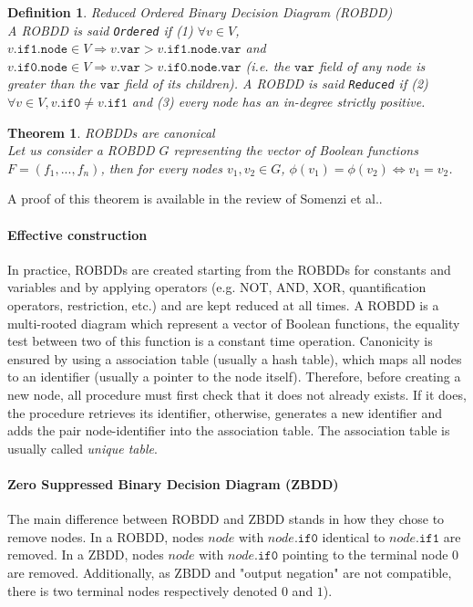 \documentclass[a4paper,10pt]{article}
\newcommand{\fieldVar}{\texttt{var}}
\newcommand{\fieldNode}{\texttt{node}}
\newcommand{\fieldThen}{\mathtt{if1}}
\newcommand{\fieldElse}{\mathtt{if0}}
\newtheorem{newtheo}{Theorem}
\newcommand{\theorem}[2]{\begin{newtheo}{\textsf{#1}\\} #2 \end{newtheo}}
\newtheorem{newdef}{Definition}
\newcommand{\definition}[2]{\begin{newdef}{#1\\}#2\end{newdef}}
\begin{document}
\definition{Reduced Ordered Binary Decision Diagram (ROBDD)}
{
A ROBDD is said \texttt{Ordered} if (1) $\forall v\in V$, $v.\fieldThen{}.\fieldNode{}\in V \Rightarrow v.\fieldVar{}> v.\fieldThen{}.\fieldNode{}.\fieldVar{}$ and $v.\fieldElse{}.\fieldNode{}\in V \Rightarrow v.\fieldVar{}> v.\fieldElse{}.\fieldNode{}.\fieldVar{}$ (i.e. the $\fieldVar{}$ field of any node is greater than the $\fieldVar{}$ field of its children).
A ROBDD is said \texttt{Reduced} if (2) $\forall v\in V, v.\fieldElse{} \neq v.\fieldThen{}$ and (3) every node has an in-degree strictly positive.
}

\theorem{ROBDDs are canonical}
{
Let us consider a ROBDD $G$ representing the vector of Boolean functions $F=(f_1, ..., f_n)$, then for every nodes $v_1, v_2 \in G$, $\phi(v_1) = \phi(v_2) \Leftrightarrow v_1 = v_2$.
}
A proof of this theorem is available in the review of Somenzi et al.\cite{Somenzi1999}.

\paragraph{Effective construction\\}
In practice, ROBDDs are created starting from the ROBDDs for constants and variables and by applying operators (e.g. NOT, AND, XOR, quantification operators, restriction, etc.) and are kept reduced at all times.
A ROBDD is a multi-rooted diagram which represent a vector of Boolean functions, the equality test between two of this function is a constant time operation.
Canonicity is ensured by using a association table (usually a hash table), which maps all nodes to an identifier (usually a pointer to the node itself).
Therefore, before creating a new node, all procedure must first check that it does not already exists. If it does, the procedure retrieves its identifier, otherwise, generates a new identifier and adds the pair node-identifier into the association table.
The association table is usually called \textit{unique table}.

\paragraph{Zero Suppressed Binary Decision Diagram (ZBDD)}
The main difference between ROBDD and ZBDD stands in how they chose to remove nodes.
In a ROBDD, nodes $node$ with $node.\fieldElse{}$ identical to $node.\fieldThen{}$ are removed.
In a ZBDD, nodes $node$ with $node.\fieldElse{}$ pointing to the terminal node $0$ are removed.
Additionally, as ZBDD and "output negation" are not compatible, there is two terminal nodes respectively denoted $0$ and $1$).
\end{document}
